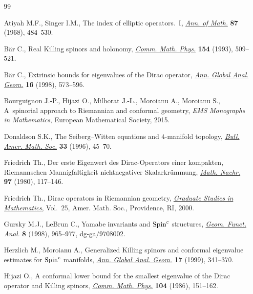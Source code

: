\documentclass[pdftex]{sigma}
\numberwithin{equation}{section}
\theoremstyle{definition}
\begin{document}
\begin{thebibliography}{99}
\footnotesize \itemsep=0pt

Atiyah M.F., Singer I.M., The index of elliptic operators.~{I}, \href{http://dx.doi.org/10.2307/1970715}{\textit{Ann. of
  Math.}} \textbf{87} (1968), 484--530.

B{\"a}r C., Real {K}illing spinors and holonomy, \href{http://dx.doi.org/10.1007/BF02102106}{\textit{Comm. Math. Phys.}}
  \textbf{154} (1993), 509--521.

B{\"a}r C., Extrinsic bounds for eigenvalues of the {D}irac operator,
  \href{http://dx.doi.org/10.1023/A:1006550532236}{\textit{Ann. Global Anal. Geom.}} \textbf{16} (1998), 573--596.

Bourguignon J.-P., Hijazi O., Milhorat J.-L., Moroianu A., Moroianu S.,
  A~spinorial approach to Riemannian and conformal geometry, \textit{EMS Monographs in
  Mathematics}, European Mathematical Society, 2015.

Donaldson S.K., The {S}eiberg--{W}itten equations and {$4$}-manifold topology,
  \href{http://dx.doi.org/10.1090/S0273-0979-96-00625-8}{\textit{Bull. Amer. Math. Soc.}} \textbf{33} (1996), 45--70.

Friedrich Th., Der erste {E}igenwert des {D}irac-{O}perators einer kompakten,
  {R}iemannschen {M}annigfaltigkeit nichtnegativer {S}kalarkr\"ummung,
  \href{http://dx.doi.org/10.1002/mana.19800970111}{\textit{Math. Nachr.}} \textbf{97} (1980), 117--146.

Friedrich Th., Dirac operators in {R}iemannian geometry, \href{http://dx.doi.org/10.1090/gsm/025}{\textit{Graduate
  Studies in Mathematics}}, Vol.~25, Amer. Math. Soc., Providence, RI, 2000.

Gursky M.J., LeBrun C., Yamabe invariants and {${\rm Spin}^c$} structures,
  \href{http://dx.doi.org/10.1007/s000390050120}{\textit{Geom. Funct. Anal.}} \textbf{8} (1998), 965--977,
  \href{http://arxiv.org/abs/dg-ga/9708002}{dg-ga/9708002}.

Herzlich M., Moroianu A., Generalized {K}illing spinors and conformal
  eigenvalue estimates for {${\rm Spin}^c$} manifolds, \href{http://dx.doi.org/10.1023/A:1006546915261}{\textit{Ann. Global
  Anal. Geom.}} \textbf{17} (1999), 341--370.

Hijazi O., A conformal lower bound for the smallest eigenvalue of the {D}irac
  operator and {K}illing spinors, \href{http://dx.doi.org/10.1007/BF01210797}{\textit{Comm. Math. Phys.}} \textbf{104}
  (1986), 151--162.


\end{thebibliography}
\end{document}
